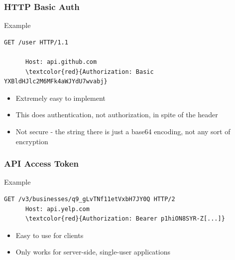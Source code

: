 \documentclass{beamer}
\begin{document}
\begin{frame}[fragile=singleslide]
  \frametitle{HTTP Basic Auth}
  \begin{block}{Example}
    \begin{Verbatim}[commandchars=\\\{\}]
      GET /user HTTP/1.1
      
      Host: api.github.com
      \textcolor{red}{Authorization: Basic YXBldHJlc2M6MFk4aWJYdU7wvabj}
    \end{Verbatim}
  \end{block}

    \begin{itemize}
      \item Extremely easy to implement
      \item This does authentication, not authorization, in spite of the header
      \item Not secure - the string there is just a base64 encoding, not any sort of encryption
    \end{itemize}
\end{frame}


\begin{frame}[fragile=singleslide]
  \frametitle{API Access Token}
  \begin{block}{Example}
    \begin{Verbatim}[commandchars=\\\{\}]
      GET /v3/businesses/q9_gLvTNf11etVxbH7JY0Q HTTP/2
      Host: api.yelp.com
      \textcolor{red}{Authorization: Bearer p1hiON8SYR-Z[...]}
    \end{Verbatim}
  \end{block}
  
  \begin{itemize}
    \item Easy to use for clients
    \item Only works for server-side, single-user applications
  \end{itemize}
\end{frame}
\end{document}
